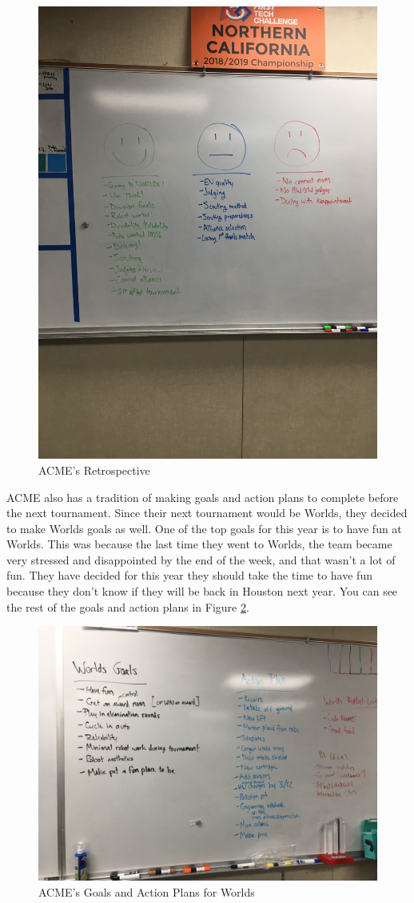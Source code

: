 \documentclass{article}
\begin{document}
\begin{figure}
    \centering
    \includegraphics[width= 0.5 \textwidth]{27_03-04/images/retrospective.JPG}
    \caption{ACME's Retrospective}
    \label{fig:retro}
\end{figure}

ACME also has a tradition of making goals and action plans to complete before the next tournament. Since their next tournament would be Worlds, they decided to make Worlds goals as well. One of the top goals for this year is to have fun at Worlds. This was because the last time they went to Worlds, the team became very stressed and disappointed by the end of the week, and that wasn't a lot of fun. They have decided for this year they should take the time to have fun because they don't know if they will be back in Houston next year. You can see the rest of the goals and action plans in Figure \ref{fig:goals}. \\

\begin{figure}
    \centering
    \includegraphics[width= 0.5 \textwidth]{27_03-04/images/goalsandactionplan.JPG}
    \caption{ACME's Goals and Action Plans for Worlds}
    \label{fig:goals}
\end{figure}
\end{document}
